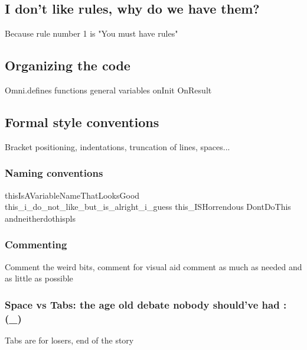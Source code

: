 \subsection{I don't like rules, why do we have them?}
\label{sub:rules}
Because rule number 1 is "You must have rules"

\subsection{Organizing the code}
\label{sub:order}
Omni.defines \newline
functions \newline
general variables \newline
onInit \newline
OnResult 

\subsection{Formal style conventions}
\label{sub:codeStyle}
Bracket positioning, indentations, truncation of lines, spaces... 

\subsubsection{Naming conventions}
\label{subsub:nameVariables}
thisIsAVariableNameThatLooksGood\newline
this\_i\_do\_not\_like\_but\_is\_alright\_i\_guess\newline
this\_ISHorrendous\newline
DontDoThis\newline
andneitherdothispls\newline

\subsubsection{Commenting}
\label{subsub:comment}

Comment the weird bits, comment for visual aid
comment as much as needed and as little as possible

\subsubsection{Space vs Tabs: the age old debate nobody should've had :(\_)}
\label{subsub:tabSpace}
Tabs are for losers, end of the story

